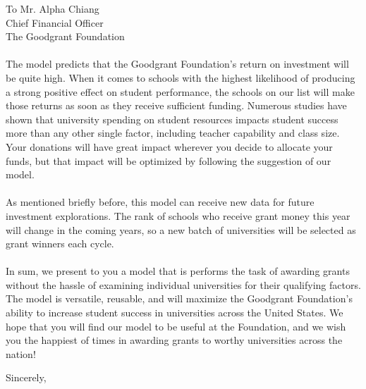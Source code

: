 \documentclass[
  fontsize=11pt,
  paper=a4,
  parskip=half,
  enlargefirstpage=on,    %
  fromalign=right,        %
  fromphone=on,           %
  fromrule=aftername,     %
  addrfield=on,           %
  backaddress=on,         %
  subject=beforeopening,  %
  locfield=narrow,        %
  foldmarks=on,           %
]{scrlttr2}
\begin{document}
\begin{letter}{To Mr. Alpha Chiang \\Chief Financial Officer\\ The Goodgrant Foundation}
    \\\\
    The model predicts that the Goodgrant Foundation's return on investment will be quite high. When it comes to schools with the highest likelihood of producing a strong positive effect on student performance, the schools on our list will make those returns as soon as they receive sufficient funding. Numerous studies have shown that university spending on student resources impacts student success more than any other single factor, including teacher capability and class size. Your donations will have great impact wherever you decide to allocate your funds, but that impact will be optimized by following the suggestion of our model.
    \\\\
    As mentioned briefly before, this model can receive new data for future investment explorations. The rank of schools who receive grant money this year will change in the coming years, so a new batch of universities will be selected as grant winners each cycle. 
    \\\\
    In sum, we present to you a model that is performs the task of awarding grants without the hassle of examining individual universities for their qualifying factors. The model is versatile, reusable, and will maximize the Goodgrant Foundation's ability to increase student success in universities across the United States. We hope that you will find our model to be useful at the Foundation, and we wish you the happiest of times in awarding grants to worthy universities across the nation! 

    \closing{Sincerely,}
  \end{letter}
\end{document}
